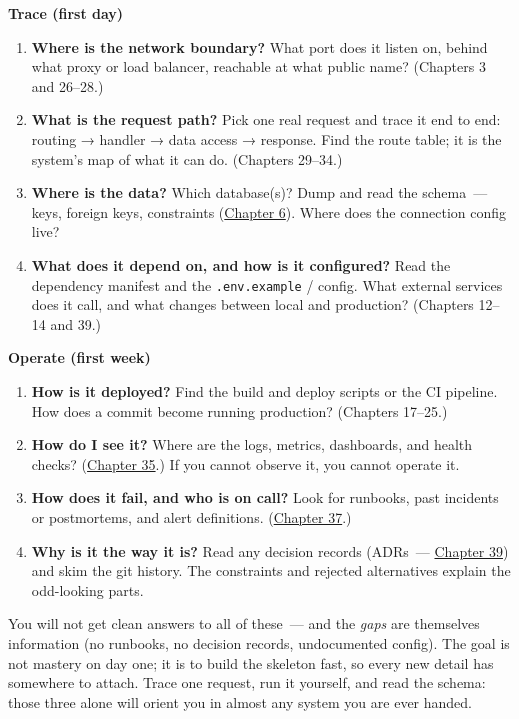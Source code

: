 \noindent{}\textbf{Trace (first day)}

\begin{enumerate}
\def\labelenumi{\arabic{enumi}.}
\setcounter{enumi}{3}
\tightlist
\item
  \textbf{Where is the network boundary?} What port does it listen on, behind what proxy or load balancer, reachable at what public name? (Chapters 3 and 26--28.)
\item
  \textbf{What is the request path?} Pick one real request and trace it end to end: routing → handler → data access → response. Find the route table; it is the system's map of what it can do. (Chapters 29--34.)
\item
  \textbf{Where is the data?} Which database(s)? Dump and read the schema~--- keys, foreign keys, constraints (\hyperref[ch:06-local-dependencies]{Chapter 6}). Where does the connection config live?
\item
  \textbf{What does it depend on, and how is it configured?} Read the dependency manifest and the \texttt{.env.example} / config. What external services does it call, and what changes between local and production? (Chapters 12--14 and 39.)
\end{enumerate}

\noindent{}\textbf{Operate (first week)}

\begin{enumerate}
\def\labelenumi{\arabic{enumi}.}
\setcounter{enumi}{7}
\tightlist
\item
  \textbf{How is it deployed?} Find the build and deploy scripts or the CI pipeline. How does a commit become running production? (Chapters 17--25.)
\item
  \textbf{How do I see it?} Where are the logs, metrics, dashboards, and health checks? (\hyperref[ch:35-observability]{Chapter 35}.) If you cannot observe it, you cannot operate it.
\item
  \textbf{How does it fail, and who is on call?} Look for runbooks, past incidents or postmortems, and alert definitions. (\hyperref[ch:37-reliability]{Chapter 37}.)
\item
  \textbf{Why is it the way it is?} Read any decision records (ADRs~--- \hyperref[ch:39-local-vs-production]{Chapter 39}) and skim the git history. The constraints and rejected alternatives explain the odd-looking parts.
\end{enumerate}

\noindent{}You will not get clean answers to all of these~--- and the \emph{gaps} are themselves information (no runbooks, no decision records, undocumented config). The goal is not mastery on day one; it is to build the skeleton fast, so every new detail has somewhere to attach. Trace one request, run it yourself, and read the schema: those three alone will orient you in almost any system you are ever handed.

